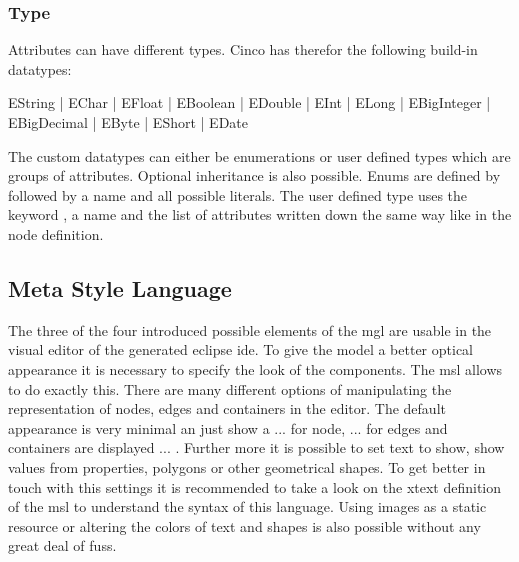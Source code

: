\subsubsection{Type}
Attributes can have different types. Cinco has therefor the following build-in datatypes:

\begin{center}
	EString | EChar | EFloat | EBoolean | EDouble | EInt | ELong | EBigInteger | EBigDecimal | EByte | EShort | EDate
\end{center}


The custom datatypes can either be enumerations or user defined types which are groups of attributes. Optional inheritance is also possible. Enums are defined by  followed by a name and all possible literals. The user defined type uses the keyword , a name and the list of attributes written down the same way like in the node definition.

\subsection{Meta Style Language}

The three of the four introduced possible elements of the \gls{mgl} are usable in the visual editor of the generated eclipse \gls{ide}. To give the model a better optical appearance it is necessary to specify the look of the components. The \gls{msl} allows to do exactly this. There are many different options of manipulating the representation of nodes, edges and containers in the editor. The default appearance is very minimal an just show a ... for node, ... for edges and containers are displayed ... \todo{}. Further more it is possible to set text to show, show values from properties, polygons or other geometrical shapes. To get better in touch with this settings it is recommended to take a look on the xtext definition of the \gls{msl} to understand the syntax of this language. Using images as a static resource or altering the colors of text and shapes is also possible without any great deal of fuss.